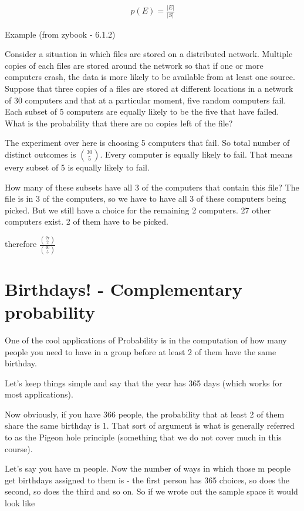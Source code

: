 \documentclass[12pt]{article}
\begin{document}
\begin{align*}
p(E) = \frac{|E|}{|S|}
\end{align*}

\pagebreak

Example (from zybook - 6.1.2)

Consider a situation in which files are stored on a distributed network. Multiple copies of each files are stored around the network so that if one or more computers crash, the data is more likely to be available from at least one source. Suppose that three copies of a files are stored at different locations in a network of 30 computers and that at a particular moment, five random computers fail. Each subset of 5 computers are equally likely to be the five that have failed. What is the probability that there are no copies left of the file?

The experiment over here is choosing 5 computers that fail. So total number of distinct outcomes is ${30 \choose 5}$. Every computer is equally likely to fail. That means every subset of 5 is equally likely to fail. 

How many of these subsets have all 3 of the computers that contain this file? The file is in 3 of the computers, so we have to have all 3 of these computers being picked. But we still have a choice for the remaining 2 computers. 27 other computers exist. 2 of them have to be picked.

therefore $\frac{{27 \choose 2}}{{30 \choose 5}}$

\section*{Birthdays! - Complementary probability}

One of the cool applications of Probability is in the computation of how many people you need to have in a group before at least 2 of them have the same birthday.

Let's keep things simple and say that the year has 365 days (which works for most applications). 

Now obviously, if you have 366 people, the probability that at least 2 of them share the same birthday is 1. That sort of argument is what is generally referred to as the Pigeon hole principle (something that we do not cover much in this course).

Let's say you have m people. Now the number of ways in which those m people get birthdays assigned to them is - the first person has 365 choices, so does the second, so does the third and so on. So if we wrote out the sample space it would look like
\end{document}
